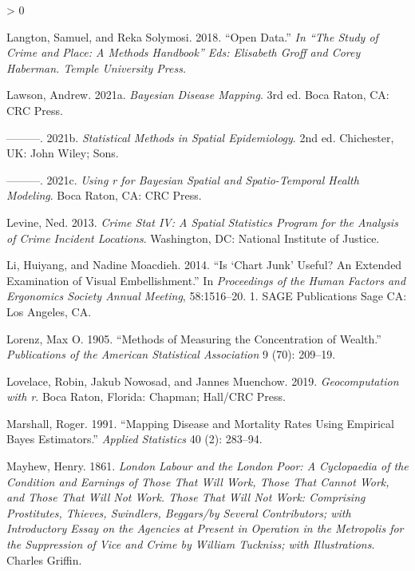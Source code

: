 \documentclass[
  krantz2]{krantz}
\newlength{\cslhangindent}
\newenvironment{CSLReferences}[2] %
 {%
  \setlength{\parindent}{0pt}
  \ifodd #1 \everypar{\setlength{\hangindent}{\cslhangindent}}\ignorespaces\fi
  \ifnum #2 > 0
  \setlength{\parskip}{#2\baselineskip}
  \fi
 }%
 {}
\begin{document}
\begin{CSLReferences}{1}{0}
\leavevmode\hypertarget{ref-Langton_2018}{}%
Langton, Samuel, and Reka Solymosi. 2018. {``Open Data.''} \emph{In {``The Study of Crime and Place: A Methods Handbook''} Eds: Elisabeth Groff and Corey Haberman. Temple University Press.}

\leavevmode\hypertarget{ref-Lawson_2021a}{}%
Lawson, Andrew. 2021a. \emph{Bayesian Disease Mapping}. 3rd ed. Boca Raton, CA: CRC Press.

\leavevmode\hypertarget{ref-Lawson_2006}{}%
---------. 2021b. \emph{Statistical Methods in Spatial Epidemiology}. 2nd ed. Chichester, UK: John Wiley; Sons.

\leavevmode\hypertarget{ref-Lawson_2021b}{}%
---------. 2021c. \emph{Using r for Bayesian Spatial and Spatio-Temporal Health Modeling}. Boca Raton, CA: CRC Press.

\leavevmode\hypertarget{ref-Levine_2013}{}%
Levine, Ned. 2013. \emph{Crime Stat IV: A Spatial Statistics Program for the Analysis of Crime Incident Locations}. Washington, DC: National Institute of Justice.

\leavevmode\hypertarget{ref-Li_2014}{}%
Li, Huiyang, and Nadine Moacdieh. 2014. {``Is {`Chart Junk'} Useful? An Extended Examination of Visual Embellishment.''} In \emph{Proceedings of the Human Factors and Ergonomics Society Annual Meeting}, 58:1516--20. 1. SAGE Publications Sage CA: Los Angeles, CA.

\leavevmode\hypertarget{ref-lorenz1905methods}{}%
Lorenz, Max O. 1905. {``Methods of Measuring the Concentration of Wealth.''} \emph{Publications of the American Statistical Association} 9 (70): 209--19.

\leavevmode\hypertarget{ref-Lovelace_2019}{}%
Lovelace, Robin, Jakub Nowosad, and Jannes Muenchow. 2019. \emph{Geocomputation with r}. Boca Raton, Florida: Chapman; Hall/CRC Press.

\leavevmode\hypertarget{ref-Marshall_1991}{}%
Marshall, Roger. 1991. {``Mapping Disease and Mortality Rates Using Empirical Bayes Estimators.''} \emph{Applied Statistics} 40 (2): 283--94.

\leavevmode\hypertarget{ref-Mayhew_1861}{}%
Mayhew, Henry. 1861. \emph{London Labour and the London Poor: A Cyclopaedia of the Condition and Earnings of Those That Will Work, Those That Cannot Work, and Those That Will Not Work. Those That Will Not Work: Comprising Prostitutes, Thieves, Swindlers, Beggars/by Several Contributors; with Introductory Essay on the Agencies at Present in Operation in the Metropolis for the Suppression of Vice and Crime by William Tuckniss; with Illustrations}. Charles Griffin.


\end{CSLReferences}
\end{document}
